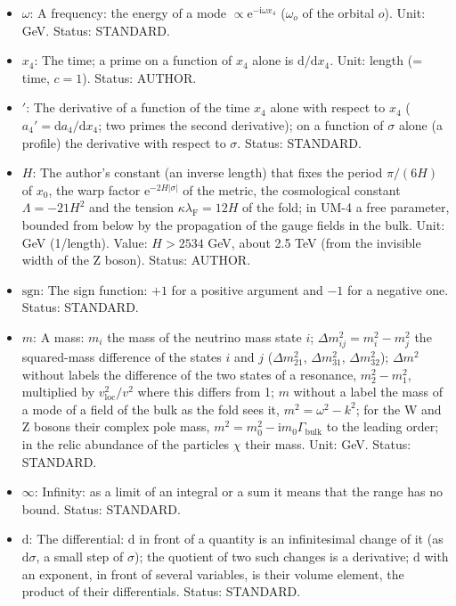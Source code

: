 \documentclass[
  10pt,
]{article}
\begin{document}
\begin{itemize}
  Status: AUTHOR.
\item
  \(\omega\): A frequency: the energy of a mode
  \(\propto \mathrm{e}^{-\mathrm{i}\omega x_4}\) (\(\omega_o\) of the
  orbital \(o\)). Unit: GeV. Status: STANDARD.
\item
  \(x_4\): The time; a prime on a function of \(x_4\) alone is
  \(\mathrm{d}/\mathrm{d}x_4\). Unit: length (= time, \(c = 1\)).
  Status: AUTHOR.
\item
  \({}'\): The derivative of a function of the time \(x_4\) alone with
  respect to \(x_4\) (\(a_4' = \mathrm{d}a_4/\mathrm{d}x_4\); two primes
  the second derivative); on a function of \(\sigma\) alone (a profile)
  the derivative with respect to \(\sigma\). Status: STANDARD.
\item
  \(H\): The author's constant (an inverse length) that fixes the period
  \(\pi/(6H)\) of \(x_0\), the warp factor
  \(\mathrm{e}^{-2H\lvert\sigma\rvert}\) of the metric, the cosmological
  constant \(\Lambda = -21H^2\) and the tension
  \(\kappa\lambda_{\mathrm{F}} = 12H\) of the fold; in UM-4 a free
  parameter, bounded from below by the propagation of the gauge fields
  in the bulk. Unit: GeV (1/length). Value: \(H > 2534\) GeV, about 2.5
  TeV (from the invisible width of the Z boson). Status: AUTHOR.
\item
  \(\mathrm{sgn}\): The sign function: \(+1\) for a positive argument
  and \(-1\) for a negative one. Status: STANDARD.
\item
  \(m\): A mass: \(m_i\) the mass of the neutrino mass state \(i\);
  \(\Delta m_{ij}^2 = m_i^2 - m_j^2\) the squared-mass difference of the
  states \(i\) and \(j\) (\(\Delta m_{21}^2\), \(\Delta m_{31}^2\),
  \(\Delta m_{32}^2\)); \(\Delta m^2\) without labels the difference of
  the two states of a resonance, \(m_2^2 - m_1^2\), multiplied by
  \(v_{\mathrm{loc}}^2/v^2\) where this differs from 1; \(m\) without a
  label the mass of a mode of a field of the bulk as the fold sees it,
  \(m^2 = \omega^2 - k^2\); for the W and Z bosons their complex pole
  mass, \(m^2 = m_0^2 - \mathrm{i}m_0\Gamma_{\mathrm{bulk}}\) to the
  leading order; in the relic abundance of the particles \(\chi\) their
  mass. Unit: GeV. Status: STANDARD.
\item
  \(\infty\): Infinity: as a limit of an integral or a sum it means that
  the range has no bound. Status: STANDARD.
\item
  \(\mathrm{d}\): The differential: \(\mathrm{d}\) in front of a
  quantity is an infinitesimal change of it (as \(\mathrm{d}\sigma\), a
  small step of \(\sigma\)); the quotient of two such changes is a
  derivative; \(\mathrm{d}\) with an exponent, in front of several
  variables, is their volume element, the product of their
  differentials. Status: STANDARD.
\end{itemize}
\end{document}
